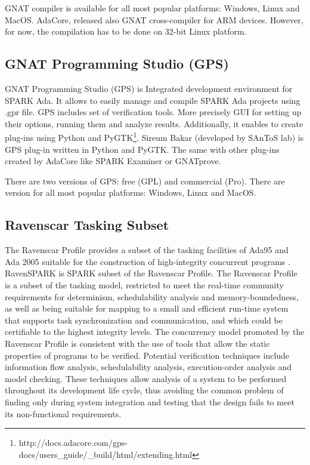 GNAT compiler is available for all most popular platforms: Windows, Linux and MacOS. AdaCore, released also GNAT cross-compiler for ARM devices. However, for now, the compilation has to be done on 32-bit Linux platform.



\subsection{GNAT Programming Studio (GPS)}
\label{background:spark:gps}

GNAT Programming Studio (GPS) is Integrated development environment for SPARK Ada. It allows to easily manage and compile SPARK Ada projects using .gpr file. GPS includes set of verification tools. More precisely GUI for setting up their options, running them and analyze results. Additionally, it enables to create plug-ins using Python and PyGTK\footnote{http://docs.adacore.com/gps-docs/users\_guide/\_build/html/extending.html}. Sireum Bakar (developed by SAnToS lab) is GPS plug-in written in Python and PyGTK. The same with other plug-ins created by AdaCore like SPARK Examiner or GNATprove.

There are two versions of GPS: free (GPL) and commercial (Pro). There are version for all most popular platforms: Windows, Linux and MacOS.



\subsection{Ravenscar Tasking Subset}
\label{background:spark:ravenscar}

The Ravenscar Profile provides a subset of the tasking facilities of Ada95 and Ada 2005 suitable for the construction of high-integrity concurrent programs \cite{Ravenscar:Online}. RavenSPARK is SPARK subset of the Ravenscar Profile. The Ravenscar Profile is a subset of the tasking model, restricted to meet the real-time community requirements for determinism, schedulability analysis and memory-boundedness, as well as being suitable for mapping to a small and efficient run-time system that supports task synchronization and communication, and which could be certifiable to the highest integrity levels. The concurrency model promoted by the Ravenscar Profile is consistent with the use of tools that allow the static properties of programs to be verified. Potential verification techniques include information flow analysis, schedulability analysis, execution-order analysis and model checking. These techniques allow analysis of a system to be performed throughout its development life cycle, thus avoiding the common problem of finding only during system integration and testing that the design fails to meet its non-functional requirements. \cite{Ravenscar:Article}

